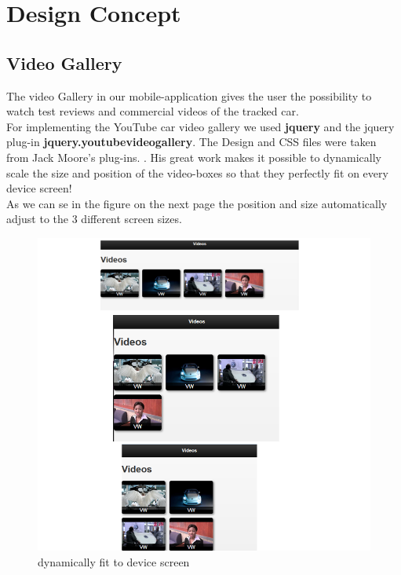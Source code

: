 

\chapter{Design Concept} \label{chapter:desgin}

\section{Video Gallery}
The video Gallery in our mobile-application gives the user the possibility to watch test reviews and commercial videos of the tracked car.
\\

   
For implementing the YouTube car video gallery we used \textbf{jquery} and the jquery plug-in \textbf{jquery.youtubevideogallery}. The Design and CSS files were taken from Jack Moore's plug-ins. \cite{jqueryVideo}. His great work makes it possible to dynamically scale the size and position of the video-boxes so that they perfectly fit on every device screen! 
\\

As we can se in the figure on the next page the position and size automatically adjust to the 3 different screen sizes.    

\begin{figure}[htbp]
\centering
\includegraphics[width=\textwidth,height=\textheight,keepaspectratio]{graphics/dynamic.png}
\caption{dynamically fit to device screen}
\end{figure}  


